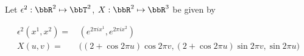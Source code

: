 Let $\epsilon^2:\bbR^2\mapsto\bbT^2$, $X:\bbR^2\mapsto\bbR^3$ be given by 

\begin{align*}
\epsilon^2 \left(x^1, x^2\right) 
	= & \,
\left(e^{2\pi i x^1}, e^{2\pi i x^2}\right)
	\\
X(u,v) 
	= & \, 
\Big((2+\cos 2 \pi u)\cos 2\pi v, (2+\cos 2 \pi u)\sin 2 \pi v, \sin 2\pi u\Big)
\end{align*}